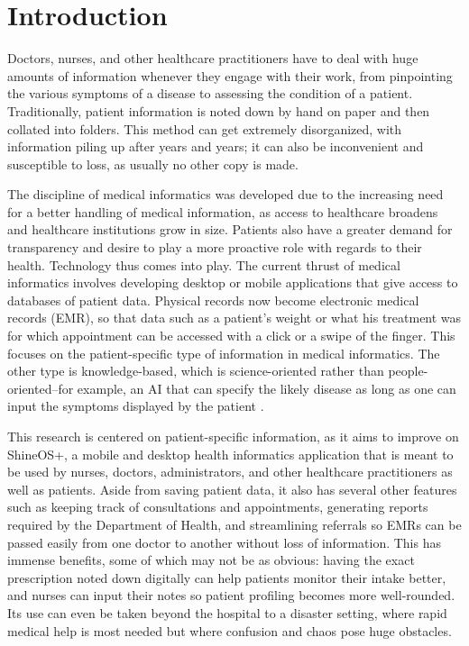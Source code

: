 \chapter{Introduction}


Doctors, nurses, and other healthcare practitioners have to deal with huge amounts of information whenever they engage with their work, from pinpointing the various symptoms of a disease to assessing the condition of a patient. Traditionally, patient information is noted down by hand on paper and then collated into folders. This method can get extremely disorganized, with information piling up after years and years; it can also be inconvenient and susceptible to loss, as usually no other copy is made.

The discipline of medical informatics was developed due to the increasing need for a better handling of medical information, as access to healthcare broadens and healthcare institutions grow in size. Patients also have a greater demand for transparency and desire to play a more proactive role with regards to their health. Technology thus comes into play. The current thrust of medical informatics involves developing desktop or mobile applications that give access to databases of patient data. Physical records now become electronic medical records (EMR), so that data such as a patient’s weight or what his treatment was for which appointment can be accessed with a click or a swipe of the finger. This focuses on the patient-specific type of information in medical informatics. The other type is knowledge-based, which is science-oriented rather than people-oriented--for example, an AI that can specify the likely disease as long as one can input the symptoms displayed by the patient \cite{williamr.hersh2002}.

This research is centered on patient-specific information, as it aims to improve on ShineOS+, a mobile and desktop health informatics application that is meant to be used by nurses, doctors, administrators, and other healthcare practitioners as well as patients. Aside from saving patient data, it also has several other features such as keeping track of consultations and appointments, generating reports required by the Department of Health, and streamlining referrals so EMRs can be passed easily from one doctor to another without loss of information. This has immense benefits, some of which may not be as obvious: having the exact prescription noted down digitally can help patients monitor their intake better, and nurses can input their notes so patient profiling becomes more well-rounded. Its use can even be taken beyond the hospital to a disaster setting, where rapid medical help is most needed but where confusion and chaos pose huge obstacles.

